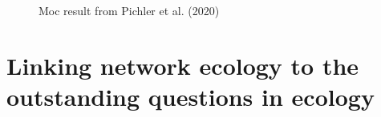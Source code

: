 \documentclass[
]{article}
\begin{document}
\begin{figure}


\caption{\label{fig-pichler}Moc result from Pichler et al. (2020)}

\end{figure}%

\section{Linking network ecology to the outstanding questions in
ecology}\label{linking-network-ecology-to-the-outstanding-questions-in-ecology}
\end{document}
